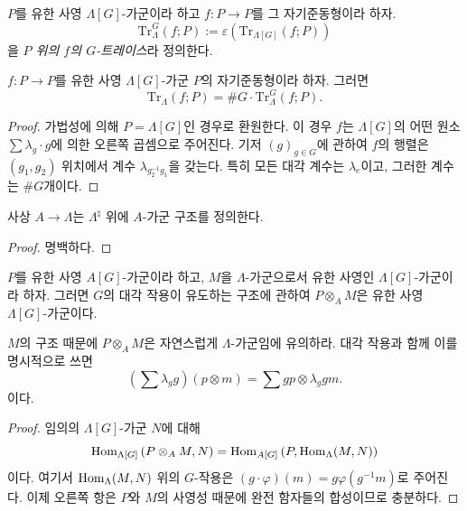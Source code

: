 \begin{definition}
\label{definition-trace-G}
$P$를 유한 사영 $\Lambda[G]$-가군이라 하고
$f : P\to P$를 그 자기준동형이라 하자.
$$
\text{Tr}_{\Lambda}^G(f; P) := \varepsilon\left(\text{Tr}_{\Lambda[G]}(f;
P)\right)
$$
을 {\it $P$ 위의 $f$의 $G$-트레이스}라 정의한다.
\end{definition}

\begin{lemma}
\label{lemma-lambda-trace}
$f : P\to P$를 유한 사영 $\Lambda[G]$-가군 $P$의 자기준동형이라 하자.
그러면
$$
\text{Tr}_{\Lambda}(f; P) = \# G \cdot \text{Tr}_\Lambda^G(f; P).
$$
\end{lemma}

\begin{proof}
가법성에 의해 $P = \Lambda[G]$인 경우로 환원한다. 이 경우 $f$는
$\Lambda[G]$의 어떤 원소 $\sum\lambda_g\cdot g$에 의한 오른쪽
곱셈으로 주어진다. 기저 $(g)_{g \in G}$에 관하여 $f$의 행렬은
$(g_1, g_2)$ 위치에서 계수 $\lambda_{g_2^{-1}g_1}$을 갖는다.
특히 모든 대각 계수는 $\lambda_e$이고, 그러한 계수는 $\# G$개이다.
\end{proof}

\begin{lemma}
\label{lemma-A-module-structure}
사상 $A\to \Lambda$는 $\Lambda^\natural$ 위에 $A$-가군 구조를
정의한다.
\end{lemma}

\begin{proof}
명백하다.
\end{proof}

\begin{lemma}
\label{lemma-diagonal-action-projective-module}
$P$를 유한 사영 $A[G]$-가군이라 하고, $M$을 $\Lambda$-가군으로서
유한 사영인 $\Lambda[G]$-가군이라 하자. 그러면 $G$의 대각 작용이
유도하는 구조에 관하여 $P \otimes_A M$은 유한 사영
$\Lambda[G]$-가군이다.
\end{lemma}

\noindent
$M$의 구조 때문에 $P \otimes_A M$은 자연스럽게
$\Lambda$-가군임에 유의하라. 대각 작용과 함께 이를 명시적으로
쓰면
$$
\left(\sum\lambda_g g\right)\left(p \otimes m\right)
=
\sum g p \otimes \lambda_g g m.
$$
이다.

\begin{proof}
임의의 $\Lambda[G]$-가군 $N$에 대해
$$
\mathop{\mathrm{Hom}}\nolimits_{\Lambda[G]}\left(P \otimes_A M, N\right)= \mathop{\mathrm{Hom}}\nolimits_{A[G]}\left(P,
\mathop{\mathrm{Hom}}\nolimits_{\Lambda}(M, N)\right)
$$
이다. 여기서 $\mathop{\mathrm{Hom}}\nolimits_{\Lambda}(M, N)$ 위의 $G$-작용은
$(g\cdot \varphi)(m) = g \varphi (g^{-1} m) $로 주어진다. 이제
오른쪽 항은 $P$와 $M$의 사영성 때문에 완전 함자들의 합성이므로
충분하다.
\end{proof}


